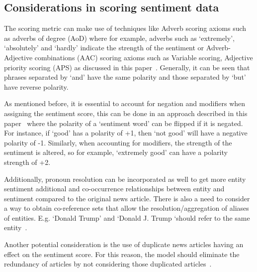 \subsection{Considerations in scoring sentiment data} \label{sentiment_scoring}

The scoring metric can make use of techniques like Adverb scoring axioms such as adverbs of degree (AoD) where for example, adverbs such as `extremely', `absolutely' and `hardly' indicate the strength of the sentiment or  Adverb-Adjective combinations (AAC) scoring axioms such as Variable scoring, Adjective priority scoring (APS) as discussed in this paper~\cite{17_benamara2007sentiment}. Generally, it can be seen that phrases separated by `and' have the same polarity and those separated by `but' have reverse polarity. 

As mentioned before, it is essential to account for negation and modifiers when assigning the sentiment score, this can be done in an approach described in this paper~\cite{22_godbole2007large} where the polarity of a `sentiment word' can be flipped if it is negated. For instance, if `good' has a polarity of +1, then `not good' will have a negative polarity of -1. Similarly, when accounting for modifiers, the strength of the sentiment is altered, so for example, `extremely good' can have a polarity strength of +2. 

Additionally, pronoun resolution can be incorporated as well to get more entity sentiment additional and co-occurrence relationships between entity and sentiment compared to the original news article. There is also a need to consider a way to obtain co-reference sets that allow the resolution/aggregation of aliases of entities. E.g. `Donald Trump' and `Donald J. Trump `should refer to the same entity~\cite{22_godbole2007large}.

Another potential consideration is the use of duplicate news articles having an effect on the sentiment score. For this reason, the model should eliminate the redundancy of articles by not considering those duplicated articles~\cite{22_godbole2007large}.
